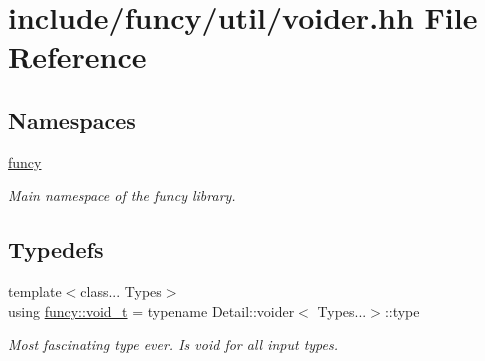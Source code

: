 \hypertarget{voider_8hh}{\section{include/funcy/util/voider.hh File Reference}
\label{voider_8hh}
}
\subsection*{Namespaces}
\begin{DoxyCompactItemize}
\item 
\hyperlink{namespacefuncy}{funcy}
\begin{DoxyCompactList}\small\item\em Main namespace of the funcy library. \end{DoxyCompactList}\end{DoxyCompactItemize}
\subsection*{Typedefs}
\begin{DoxyCompactItemize}
\item 
{\footnotesize template$<$class... Types$>$ }\\using \hyperlink{namespacefuncy_a32da2ae6d9298793159777c02d9ddcfb}{funcy\-::void\-\_\-t} = typename Detail\-::voider$<$ Types...$>$\-::type
\begin{DoxyCompactList}\small\item\em Most fascinating type ever. Is void for all input types. \end{DoxyCompactList}\end{DoxyCompactItemize}
